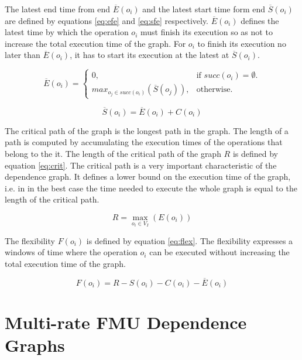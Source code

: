 The latest end time from end $\overline{E}(o_i)$ and the latest start time form end $\overline{S}(o_i)$ are defined by equations \ref{eq:efe} and \ref{eq:sfe} respectively. $\overline{E}(o_i)$ defines the latest time by which the operation $o_i$ must finish its execution so as not to increase the total execution time of the graph. For $o_i$ to finish its execution no later than $\overline{E}(o_i)$, it has to start its execution at the latest at $\overline{S}(o_i)$. 

\begin{equation}
\overline{E}(o_i)=\begin{cases}
    0, & \text{if $succ(o_i)=\emptyset$}.\\
    max_{o_j \in succ(o_i)}(\overline{S}(o_j)), & \text{otherwise}.
  \end{cases}
	\label{eq:sfs}
\end{equation}

\begin{equation}
	\overline{S}(o_i)=\overline{E}(o_i)+C(o_i) 
	\label{eq:efs}
\end{equation}

The critical path of the graph is the longest path in the graph. The length of a path is computed by accumulating the execution times of the operations that belong to the it. The length of the critical path of the graph $R$ is defined by equation \ref{eq:crit}. The critical path is a very important characteristic of the dependence graph. It defines a lower bound on the execution time of the graph, i.e. in in the best case the time needed to execute the whole graph is equal to the length of the critical path. 

\begin{equation}
	R = \max_{o_i \in V_I}(E(o_i)) 
	\label{eq:crit}
\end{equation}
 
The flexibility $F(o_i)$ is defined by equation \ref{eq:flex}. The flexibility expresses a windows of time where the operation $o_i$ can be executed without increasing the total execution time of the graph.

\begin{equation}
	F(o_i) = R - S(o_i) - C(o_i) - \overline{E}(o_i) 
	\label{eq:flex}
\end{equation}

\section{Multi-rate FMU Dependence Graphs}

